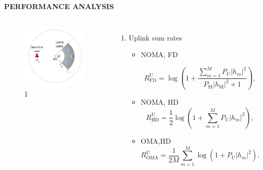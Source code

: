 \documentclass[aspectratio=169]{beamer}
\begin{document}
\begin{frame}{\textbf{{\LARGE{P}}ERFORMANCE {\LARGE{A}}NALYSIS}}
	
	\begin{columns}
		\begin{figure}
			\centering
			\includegraphics[width=1\linewidth]{images/fig1.pdf}
			\caption{1}
		\end{figure}
		
		\begin{enumerate}
			\item Uplink sum rates 
			\begin{itemize}
				\item  NOMA, FD
			
				\begin{equation}
					R_{\text{FD}}^{\text{U}} = \log\left( 1 + \frac{\sum_{m = 1}^M P_{\text{U}}\left\vert h_m\right\vert^2}{ P_{\text{SI}}\left\vert h_{\text{SI}}\right\vert^2 + 1} \right),
				\end{equation}
				\item NOMA, HD
				\begin{equation}
					R_{\text{HD}}^{\text{U}} = \frac{1}{2}\log\left( 1 + \sum_{m=1}^MP_{\text{U}}\left\vert h_m \right\vert^2 \right),
				\end{equation}
				\item OMA,HD \begin{equation}
						R_{\text{OMA}}^{\text{U}} = \frac{1}{2M}\sum_{m=1}^M \log\left( 1+P_\text{U}\left\vert h_m\right\vert^2 \right).
					\end{equation}
			\end{itemize}
		\end{enumerate}
		\end{columns}
\end{frame}
\end{document}
